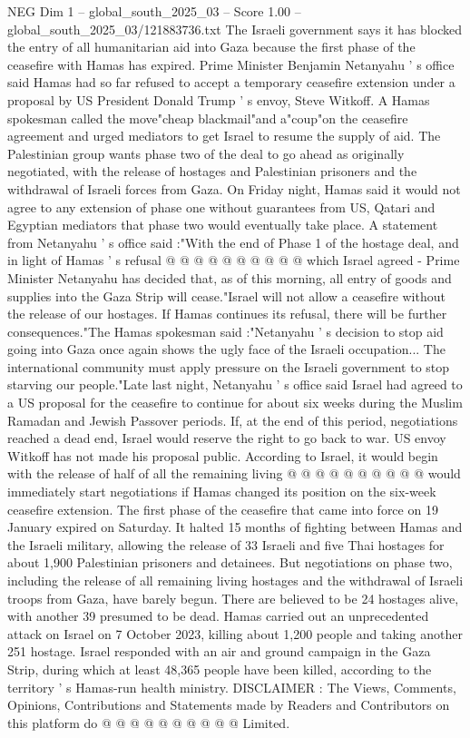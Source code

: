 \begin{textsample}{NEG Dim 1 – global\_south\_2025\_03 – Score 1.00 – global\_south\_2025\_03/121883736.txt}  \label{ex:f1_neg_166}
The Israeli government says it has blocked the entry of all humanitarian aid into Gaza because the first phase of the ceasefire with Hamas has expired.
Prime Minister Benjamin Netanyahu ' s office said Hamas had so far refused to accept a temporary ceasefire extension under a proposal by US President Donald Trump ' s envoy, Steve Witkoff.
A Hamas spokesman called the move"cheap blackmail"and a"coup"on the ceasefire agreement and urged mediators to get Israel to resume the supply of aid.
The Palestinian group wants phase two of the deal to go ahead as originally negotiated, with the release of hostages and Palestinian prisoners and the withdrawal of Israeli forces from Gaza.
On Friday night, Hamas said it would not agree to any extension of phase one without guarantees from US, Qatari and Egyptian mediators that phase two would eventually take place.
A statement from Netanyahu ' s office said :"With the end of Phase 1 of the hostage deal, and in light of Hamas ' s refusal @ @ @ @ @ @ @ @ @ @ which Israel agreed - Prime Minister Netanyahu has decided that, as of this morning, all entry of goods and supplies into the Gaza Strip will cease."Israel will not allow a ceasefire without the release of our hostages.
If Hamas continues its refusal, there will be further consequences."The Hamas spokesman said :"Netanyahu ' s decision to stop aid going into Gaza once again shows the ugly face of the Israeli occupation...
The international community must apply pressure on the Israeli government to stop starving our people."Late last night, Netanyahu ' s office said Israel had agreed to a US proposal for the ceasefire to continue for about six weeks during the Muslim Ramadan and Jewish Passover periods.
If, at the end of this period, negotiations reached a dead end, Israel would reserve the right to go back to war.
US envoy Witkoff has not made his proposal public.
According to Israel, it would begin with the release of half of all the remaining living @ @ @ @ @ @ @ @ @ @ would immediately start negotiations if Hamas changed its position on the six-week ceasefire extension.
The first phase of the ceasefire that came into force on 19 January expired on Saturday.
It halted 15 months of fighting between Hamas and the Israeli military, allowing the release of 33 Israeli and five Thai hostages for about 1,900 Palestinian prisoners and detainees.
But negotiations on phase two, including the release of all remaining living hostages and the withdrawal of Israeli troops from Gaza, have barely begun.
There are believed to be 24 hostages alive, with another 39 presumed to be dead.
Hamas carried out an unprecedented attack on Israel on 7 October 2023, killing about 1,200 people and taking another 251 hostage.
Israel responded with an air and ground campaign in the Gaza Strip, during which at least 48,365 people have been killed, according to the territory ' s Hamas-run health ministry.
DISCLAIMER : The Views, Comments, Opinions, Contributions and Statements made by Readers and Contributors on this platform do @ @ @ @ @ @ @ @ @ @ Limited.

\end{textsample}
